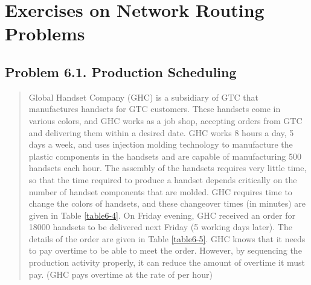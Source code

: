 \section{Exercises on Network Routing Problems}

\subsection{Problem 6.1. Production Scheduling}

\paragarph{}
\begin{quote}
Global Handset Company (GHC) is a subsidiary of GTC that manufactures handsets for GTC customers. These handsets come in various colors, and GHC works as a job shop, accepting orders from GTC and delivering them within a desired date. GHC works 8 hours a day, 5 days a week, and uses injection molding technology to manufacture the plastic components in the handsets and are capable of manufacturing 500 handsets each hour. The assembly of the handsets requires very little time, so that the time required to produce a handset depends critically on the number of handset components that are molded. GHC requires time to change the colors of handsets, and these changeover times (in minutes) are given in Table \ref{table6-4}. On Friday evening, GHC received an order for 18000 handsets to be delivered next Friday (5 working days later). The details of the order are given in Table \ref{table6-5}. GHC knows that it needs to pay overtime to be able to meet the order. However, by sequencing the production activity properly, it can reduce the amount of overtime it must pay. (GHC pays overtime at the rate of  per hour)
\end{quote}

